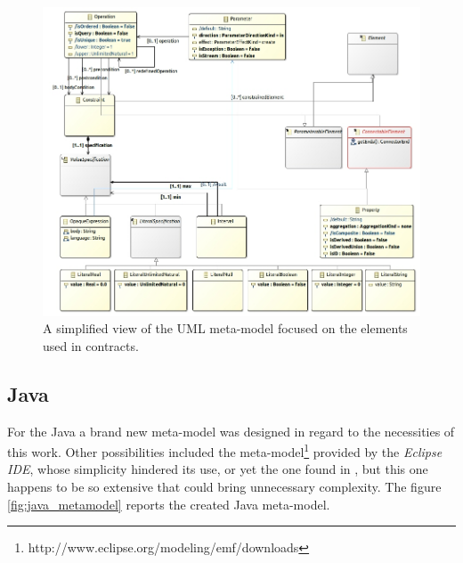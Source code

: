 \documentclass[tuberlin,cic,tc,english,noabntcite]{iiufrgs}
\begin{document}
\begin{figure}[h]
    \caption{A simplified view of the UML meta-model focused on the elements used in contracts.}
    \begin{center}
        \includegraphics[width=40em]{uml_metamodel_contracts}
    \end{center}
    \label{fig:uml_metamodel_contracts}
\end{figure}


\subsection{Java}
For the Java a brand new meta-model was designed in regard to the necessities of this work. Other possibilities included the meta-model\footnote{http://www.eclipse.org/modeling/emf/downloads} provided by the \emph{Eclipse IDE}, whose simplicity hindered its use, or yet the one found in \citet{heidenreich2010closing}, but this one happens to be so extensive that could bring unnecessary complexity. The figure \ref{fig:java_metamodel} reports the created Java meta-model.

\end{document}
